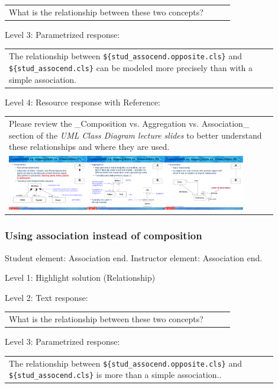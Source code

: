 \begin{tabular}{|p{0.9\linewidth}}
What is the relationship between these two concepts?
\end{tabular} \medskip

\noindent Level 3: Parametrized response: \medskip

\begin{tabular}{|p{0.9\linewidth}}
The relationship between \verb|${stud_assocend.opposite.cls}| and \verb|${stud_assocend.cls}| can be modeled more precisely than with a simple association.
\end{tabular} \medskip

\noindent Level 4: Resource response with Reference: \medskip

\begin{tabular}{|p{0.9\linewidth}}
Please review the _Composition vs. Aggregation vs. Association_ section of 
the \textit{UML Class Diagram lecture slides} to 
better understand these relationships and where they are used.

\\
\includegraphics[width=0.9\textwidth]{images/composition_aggregation_association.png}
\end{tabular} \medskip


\subsubsection{Using association instead of composition}

Student element: Association end. Instructor element: Association end. \medskip

\noindent Level 1: Highlight solution (Relationship) \medskip

\noindent Level 2: Text response: \medskip

\begin{tabular}{|p{0.9\linewidth}}
What is the relationship between these two concepts?
\end{tabular} \medskip

\noindent Level 3: Parametrized response: \medskip

\begin{tabular}{|p{0.9\linewidth}}
The relationship between \verb|${stud_assocend.opposite.cls}| and \verb|${stud_assocend.cls}| is more than a simple association..
\end{tabular} \medskip

